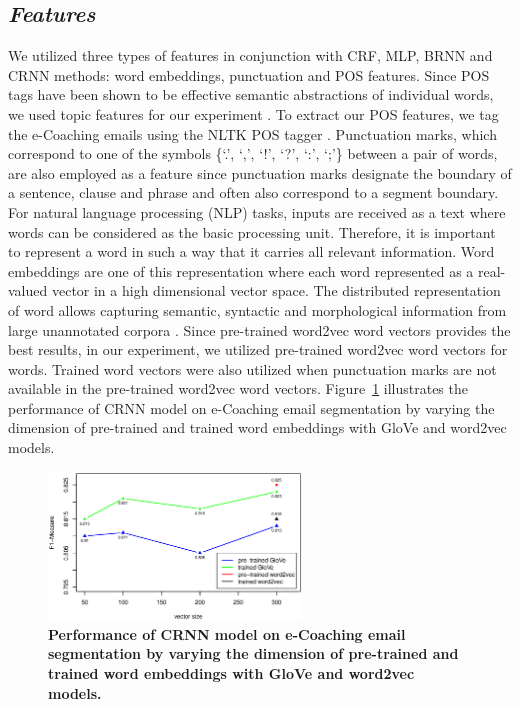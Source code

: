 \documentclass{amia}
\begin{document}
\subsection*{\textit{Features}}

We utilized three types of features in conjunction with CRF, MLP, BRNN and CRNN methods: word embeddings, punctuation and POS features. Since POS tags have been shown to be effective semantic abstractions of individual words, we used topic features for our experiment \cite{liu2005using,treviso2017sentence}. To extract our POS features, we tag the e-Coaching emails using the NLTK POS tagger \cite{bird2009natural}. Punctuation marks, which correspond to one of the symbols \{`.', `,', `!', `?', `:', `;'\} between a pair of words, are also employed as a feature since punctuation marks designate the boundary of a sentence, clause and phrase and often also correspond to a segment boundary. For natural language processing (NLP) tasks, inputs are received as a text where words can be considered as the basic processing unit. Therefore, it is important to represent a word in such a way that it carries all relevant information. Word embeddings are one of this representation where each word represented as a real-valued vector in a high dimensional vector space. The distributed representation of word allows capturing semantic, syntactic and morphological information from large unannotated corpora  \cite{pennington2014glove, mikolov2013distributed}. Since pre-trained word2vec word vectors provides the best results, in our experiment, we utilized pre-trained word2vec word vectors for words. Trained word vectors were also utilized when punctuation marks are not available in the pre-trained word2vec word vectors. Figure~\ref{fig:embedding-dimension} illustrates the performance of CRNN model on e-Coaching email segmentation by varying the dimension of pre-trained and trained word embeddings with GloVe and word2vec models. 

\begin{figure}[!htb]
    \centering
    \includegraphics[width=0.6\textwidth]{figures/embedding-dimension.eps}
    \caption{\textbf{Performance of CRNN model on e-Coaching email segmentation by varying the dimension of pre-trained and trained word embeddings with GloVe and word2vec models.}}
    \label{fig:embedding-dimension}
\end{figure}   
\end{document}

